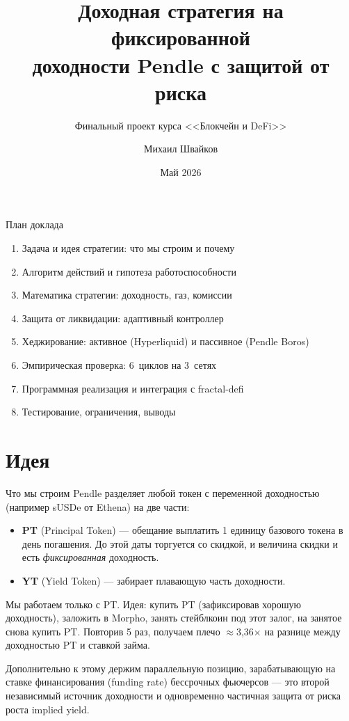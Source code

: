 \documentclass[11pt,aspectratio=169]{beamer}
\title[Leveraged carry на Pendle]{%
  Доходная стратегия на фиксированной\\ доходности Pendle с защитой от риска}
\subtitle{Финальный проект курса <<Блокчейн и DeFi>>}
\author{Михаил Швайков}
\date{Май 2026}
\begin{document}
\begin{frame}[plain]
  \titlepage
\end{frame}

\begin{frame}{План доклада}
  \begin{enumerate}\itemsep0.5em
    \item Задача и идея стратегии: что мы строим и почему
    \item Алгоритм действий и гипотеза работоспособности
    \item Математика стратегии: доходность, газ, комиссии
    \item Защита от ликвидации: адаптивный контроллер
    \item Хеджирование: активное (Hyperliquid) и пассивное (Pendle Boros)
    \item Эмпирическая проверка: 6~циклов на 3~сетях
    \item Программная реализация и интеграция с fractal-defi
    \item Тестирование, ограничения, выводы
  \end{enumerate}
\end{frame}

\section{Идея}

\begin{frame}{Что мы строим}
  Pendle разделяет любой токен с переменной доходностью (например sUSDe от Ethena)
  на две части:
  \begin{itemize}\itemsep0.2em
    \item \textbf{PT} (Principal Token) --- обещание выплатить 1 единицу
          базового токена в день погашения. До этой даты торгуется со
          скидкой, и величина скидки и есть \emph{фиксированная} доходность.
    \item \textbf{YT} (Yield Token) --- забирает плавающую часть доходности.
  \end{itemize}

  \vspace{0.4em}
  Мы работаем только с PT. Идея: купить PT (зафиксировав хорошую доходность),
  заложить в Morpho, занять стейблкоин под этот залог, на занятое снова купить
  PT. Повторив 5 раз, получаем плечо $\approx$3{,}36$\times$ на разнице между
  доходностью PT и ставкой займа.

  \vspace{0.4em}
  Дополнительно к этому держим параллельную позицию, зарабатывающую на
  ставке финансирования (funding rate) бессрочных фьючерсов --- это
  второй независимый источник доходности и одновременно частичная защита
  от риска роста implied yield.
\end{frame}
\end{document}
